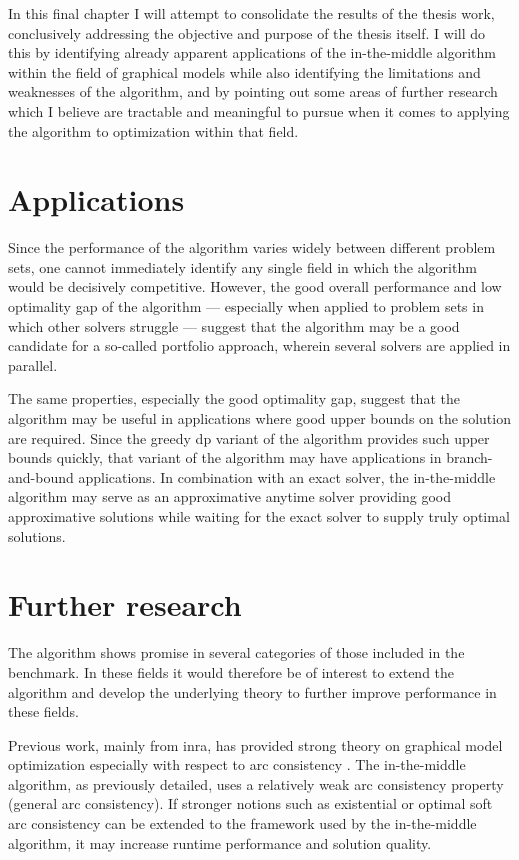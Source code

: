 In this final chapter I will attempt to consolidate the results of the thesis work, conclusively addressing the objective and purpose of the thesis itself.
I will do this by identifying already apparent applications of the in-the-middle algorithm within the field of graphical models while also identifying the limitations and weaknesses of the algorithm, and by pointing out some areas of further research which I believe are tractable and meaningful to pursue when it comes to applying the algorithm to optimization within that field.

\section{Applications}
Since the performance of the algorithm varies widely between different problem sets, one cannot immediately identify any single field in which the algorithm would be decisively competitive.
However, the good overall performance and low optimality gap of the algorithm --- especially when applied to problem sets in which other solvers struggle --- suggest that the algorithm may be a good candidate for a so-called portfolio approach, wherein several solvers are applied in parallel.

The same properties, especially the good optimality gap, suggest that the algorithm may be useful in applications where good upper bounds on the solution are required.
Since the greedy \gls{dp} variant of the algorithm provides such upper bounds quickly, that variant of the algorithm may have applications in branch-and-bound applications.
In combination with an exact solver, the in-the-middle algorithm may serve as an approximative anytime solver providing good approximative solutions while waiting for the exact solver to supply truly optimal solutions.

\section{Further research}
The algorithm shows promise in several categories of those included in the benchmark.
In these fields it would therefore be of interest to extend the algorithm and develop the underlying theory to further improve performance in these fields.

Previous work, mainly from \gls{inra}, has provided strong theory on graphical model optimization especially with respect to arc consistency \parencite{Cooper10,Cooper08,deGivry06,deGivry05}.
The in-the-middle algorithm, as previously detailed, uses a relatively weak arc consistency property (general arc consistency).
If stronger notions such as existential \parencite{deGivry05} or optimal soft \parencite{Cooper10} arc consistency can be extended to the framework used by the in-the-middle algorithm, it may increase runtime performance and solution quality.

